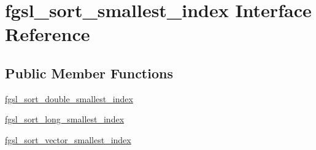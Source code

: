 \hypertarget{interfacefgsl__sort__smallest__index}{\section{fgsl\-\_\-sort\-\_\-smallest\-\_\-index Interface Reference}
\label{interfacefgsl__sort__smallest__index}
}
\subsection*{Public Member Functions}
\begin{DoxyCompactItemize}
\item 
\hyperlink{interfacefgsl__sort__smallest__index_ade4dc1cac96031ab43350ccf566b799d}{fgsl\-\_\-sort\-\_\-double\-\_\-smallest\-\_\-index}
\item 
\hyperlink{interfacefgsl__sort__smallest__index_a5f8981ef0c624c3592e9258641ca34e2}{fgsl\-\_\-sort\-\_\-long\-\_\-smallest\-\_\-index}
\item 
\hyperlink{interfacefgsl__sort__smallest__index_af85d6291930b7b6a77712513cf395f68}{fgsl\-\_\-sort\-\_\-vector\-\_\-smallest\-\_\-index}
\end{DoxyCompactItemize}


